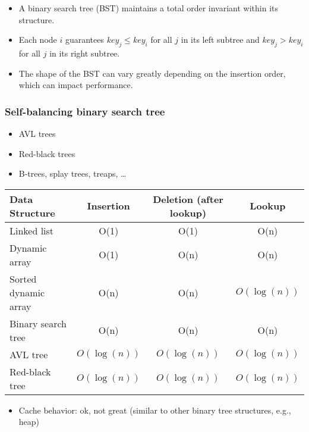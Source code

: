 \documentclass[12pt]{article}
\begin{document}
\begin{itemize}
    \item A binary search tree (BST) maintains a total order invariant within its structure.
    \item Each node \( i \) guarantees \( key_j \leq key_i \) for all \( j \) in its left subtree and \( key_j > key_i \) for all \( j \) in its right subtree.
    \item The shape of the BST can vary greatly depending on the insertion order, which can impact performance.
\end{itemize}

\subsubsection{Self-balancing binary search tree}

\begin{itemize}
    \item AVL trees
    \item Red-black trees
    \item B-trees, splay trees, treaps, \ldots
\end{itemize}

\begin{tabular}{lccc}
\hline
\textbf{Data Structure}     & \textbf{Insertion}         & \textbf{Deletion (after lookup)} & \textbf{Lookup}      \\
\hline
Linked list                 & O(1)                       & O(1)                            & O(n)                 \\
Dynamic array               & O(1)                       & O(n)                            & O(n)                 \\
Sorted dynamic array        & O(n)                       & O(n)                            & $O(\log(n))$           \\
Binary search tree          & O(n)                       & O(n)                            & O(n)                 \\
AVL tree                    & $O(\log(n))$                 & $O(\log(n))$                      & $O(\log(n))$           \\
Red-black tree              & $O(\log(n))$                 & $O(\log(n))$                      & $O(\log(n))$           \\
\hline
\end{tabular}


\begin{itemize}
    \item Cache behavior: ok, not great (similar to other binary tree structures, e.g., heap)
\end{itemize}
\end{document}
